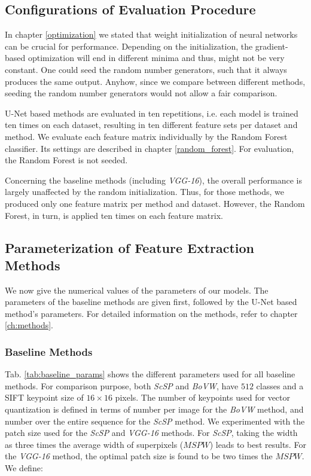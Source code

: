 \subsection{Configurations of Evaluation Procedure} \label{ch:eval_configs}
In chapter \ref{optimization} we stated that weight initialization of neural networks can be crucial for performance. Depending on the initialization, the gradient-based optimization will end in different minima and thus, might not be very constant. One could seed the random number generators, such that it always produces the same output. Anyhow, since we compare between different methods, seeding the random number generators would not allow a fair comparison.

U-Net based methods are evaluated in ten repetitions, i.e. each model is trained ten times on each dataset, resulting in ten different feature sets per dataset and method. We evaluate each feature matrix individually by the Random Forest classifier. Its settings are described in chapter \ref{random_forest}. For evaluation, the Random Forest is not seeded.

Concerning the baseline methods (including \textit{VGG-16}), the overall performance is largely unaffected by the random initialization. Thus, for those methods, we produced only one feature matrix per method and dataset. However, the Random Forest, in turn, is applied ten times on each feature matrix.

\subsection{Parameterization of Feature Extraction Methods}
We now give the numerical values of the parameters of our models. The parameters of the baseline methods are given first, followed by the U-Net based method's parameters. For detailed information on the methods, refer to chapter \ref{ch:methods}.

\subsubsection{Baseline Methods}
Tab. \ref{tab:baseline_params} shows the different parameters used for all baseline methods. For comparison purpose, both \textit{ScSP} and \textit{BoVW}, have $512$ classes and a SIFT keypoint size of $16 \times 16$ pixels. The number of keypoints used for vector quantization is defined in terms of number per image for the \textit{BoVW} method, and number over the entire sequence for the \textit{ScSP} method. We experimented with the patch size used for the \textit{ScSP} and \textit{VGG-16} methods. For \textit{ScSP}, taking the width as three times the average width of superpixels ($MSPW$) leads to best results. For the \textit{VGG-16} method, the optimal patch size is found to be two times the $MSPW$. We define:


